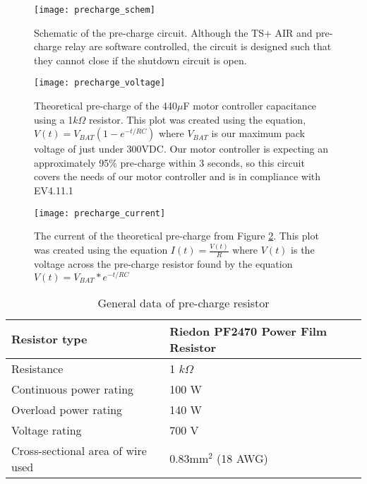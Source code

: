 \documentclass{article}
\begin{document}
\begin{figure}[H]
    \centering
    \texttt{[image: precharge\_schem]}
    \caption{Schematic of the pre-charge circuit. Although the TS+ AIR and pre-charge relay are software controlled, the circuit is designed such that they cannot close if the shutdown circuit is open.}
    \label{precharge_schem}
\end{figure}

\begin{figure}[H]
    \centering
    \texttt{[image: precharge\_voltage]}
    \caption{Theoretical pre-charge of the 440$\mu$F motor controller capacitance using a 1$k\Omega$ resistor. This plot was created using the equation, $V(t) = V_{BAT}(1 - e^{-t/RC})$ where $V_{BAT}$ is our maximum pack voltage of just under 300VDC. Our motor controller is expecting an approximately 95\% pre-charge within 3 seconds, so this circuit covers the needs of our motor controller and is in compliance with EV4.11.1 }
    \label{precharge_voltage}
\end{figure}

\begin{figure}[H]
    \centering
    \texttt{[image: precharge\_current]}
    \caption{The current of the theoretical pre-charge from Figure \ref{precharge_voltage}. This plot was created using the equation $I(t) = \frac{V(t)}{R}$ where $V(t)$ is the voltage across the pre-charge resistor found by the equation $V(t) = V_{BAT} * e^{-t/RC}$ }
    \label{precharge_current}
\end{figure}

    \begin{table}[H]
	    \centering
	    \begin{tabular}{|l|l|}
	    \hline
	    Resistor type & Riedon PF2470 Power Film Resistor \\ \hline
	    Resistance & 1 $k\Omega$ \\ \hline
	    Continuous power rating & 100 W \\ \hline
	    Overload power rating & 140 W \\ \hline
	    Voltage rating & 700 V \\ \hline
	    Cross-sectional area of wire used & 0.83mm$^2$ (18 AWG)\\ \hline
	    \end{tabular}
	    \caption{General data of pre-charge resistor}
	    \label{prechargeresistor}
	\end{table}
\end{document}
